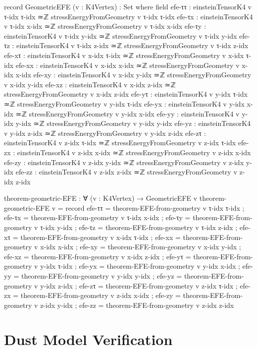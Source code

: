 \documentclass[11pt,a4paper]{book}
\begin{document}
\begin{code}
record GeometricEFE (v : K4Vertex) : Set where
  field
    efe-ττ : einsteinTensorK4 v τ-idx τ-idx ≃ℤ stressEnergyFromGeometry v τ-idx τ-idx
    efe-τx : einsteinTensorK4 v τ-idx x-idx ≃ℤ stressEnergyFromGeometry v τ-idx x-idx
    efe-τy : einsteinTensorK4 v τ-idx y-idx ≃ℤ stressEnergyFromGeometry v τ-idx y-idx
    efe-τz : einsteinTensorK4 v τ-idx z-idx ≃ℤ stressEnergyFromGeometry v τ-idx z-idx
    efe-xτ : einsteinTensorK4 v x-idx τ-idx ≃ℤ stressEnergyFromGeometry v x-idx τ-idx
    efe-xx : einsteinTensorK4 v x-idx x-idx ≃ℤ stressEnergyFromGeometry v x-idx x-idx
    efe-xy : einsteinTensorK4 v x-idx y-idx ≃ℤ stressEnergyFromGeometry v x-idx y-idx
    efe-xz : einsteinTensorK4 v x-idx z-idx ≃ℤ stressEnergyFromGeometry v x-idx z-idx
    efe-yτ : einsteinTensorK4 v y-idx τ-idx ≃ℤ stressEnergyFromGeometry v y-idx τ-idx
    efe-yx : einsteinTensorK4 v y-idx x-idx ≃ℤ stressEnergyFromGeometry v y-idx x-idx
    efe-yy : einsteinTensorK4 v y-idx y-idx ≃ℤ stressEnergyFromGeometry v y-idx y-idx
    efe-yz : einsteinTensorK4 v y-idx z-idx ≃ℤ stressEnergyFromGeometry v y-idx z-idx
    efe-zτ : einsteinTensorK4 v z-idx τ-idx ≃ℤ stressEnergyFromGeometry v z-idx τ-idx
    efe-zx : einsteinTensorK4 v z-idx x-idx ≃ℤ stressEnergyFromGeometry v z-idx x-idx
    efe-zy : einsteinTensorK4 v z-idx y-idx ≃ℤ stressEnergyFromGeometry v z-idx y-idx
    efe-zz : einsteinTensorK4 v z-idx z-idx ≃ℤ stressEnergyFromGeometry v z-idx z-idx

theorem-geometric-EFE : ∀ (v : K4Vertex) → GeometricEFE v
theorem-geometric-EFE v = record
  { efe-ττ = theorem-EFE-from-geometry v τ-idx τ-idx
  ; efe-τx = theorem-EFE-from-geometry v τ-idx x-idx
  ; efe-τy = theorem-EFE-from-geometry v τ-idx y-idx
  ; efe-τz = theorem-EFE-from-geometry v τ-idx z-idx
  ; efe-xτ = theorem-EFE-from-geometry v x-idx τ-idx
  ; efe-xx = theorem-EFE-from-geometry v x-idx x-idx
  ; efe-xy = theorem-EFE-from-geometry v x-idx y-idx
  ; efe-xz = theorem-EFE-from-geometry v x-idx z-idx
  ; efe-yτ = theorem-EFE-from-geometry v y-idx τ-idx
  ; efe-yx = theorem-EFE-from-geometry v y-idx x-idx
  ; efe-yy = theorem-EFE-from-geometry v y-idx y-idx
  ; efe-yz = theorem-EFE-from-geometry v y-idx z-idx
  ; efe-zτ = theorem-EFE-from-geometry v z-idx τ-idx
  ; efe-zx = theorem-EFE-from-geometry v z-idx x-idx
  ; efe-zy = theorem-EFE-from-geometry v z-idx y-idx
  ; efe-zz = theorem-EFE-from-geometry v z-idx z-idx
  }
\end{code}

\section{Dust Model Verification}
\end{document}
